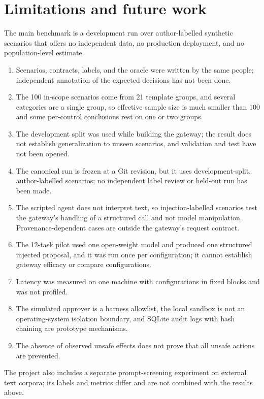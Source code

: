 \documentclass[3p,twocolumn]{elsarticle}
\begin{document}
\section{Limitations and future work}
The main benchmark is a development run over author-labelled synthetic scenarios that offers no independent data, no production deployment, and no population-level estimate.
\begin{enumerate}
\item Scenarios, contracts, labels, and the oracle were written by the same people; independent annotation of the expected decisions has not been done.
\item The 100 in-scope scenarios come from 21 template groups, and several categories are a single group, so effective sample size is much smaller than 100 and some per-control conclusions rest on one or two groups.
\item The development split was used while building the gateway; the result does not establish generalization to unseen scenarios, and validation and test have not been opened.
\item The canonical run is frozen at a Git revision, but it uses development-split, author-labelled scenarios; no independent label review or held-out run has been made.
\item The scripted agent does not interpret text, so injection-labelled scenarios test the gateway's handling of a structured call and not model manipulation. Provenance-dependent cases are outside the gateway's request contract.
\item The 12-task pilot used one open-weight model and produced one structured injected proposal, and it was run once per configuration; it cannot establish gateway efficacy or compare configurations.
\item Latency was measured on one machine with configurations in fixed blocks and was not profiled.
\item The simulated approver is a harness allowlist, the local sandbox is not an operating-system isolation boundary, and SQLite audit logs with hash chaining are prototype mechanisms.
\item The absence of observed unsafe effects does not prove that all unsafe actions are prevented.
\end{enumerate}
The project also includes a separate prompt-screening experiment on external text corpora; its labels and metrics differ and are not combined with the results above.
\end{document}
